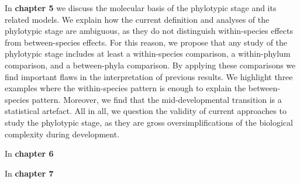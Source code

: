 In \textbf{chapter 5} we discuss the molecular basis of the phylotypic stage and its related models. We explain how the current definition and analyses of the phylotypic stage are ambiguous, as they do not distinguish within-species effects from between-species effects. For this reason, we propose that any study of the phylotypic stage includes at least a within-species comparison, a within-phylum comparison, and a between-phyla comparison. By applying these comparisons we find important flaws in the interpretation of previous results. We highlight three examples where the within-species pattern is enough to explain the between-species pattern. Moreover, we find that the mid-developmental transition is a statistical artefact. All in all, we question the validity of current approaches to study the phylotypic stage, as they are gross oversimplifications of the biological complexity during development.

In \textbf{chapter 6} 

In \textbf{chapter 7} 
